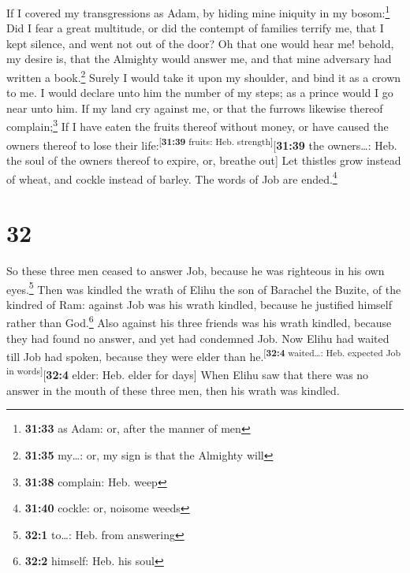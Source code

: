  If I covered my transgressions as Adam, by hiding mine
iniquity in my bosom:\footnote{\textbf{31:33} as Adam: or, after the
  manner of men}  Did I fear a great multitude, or did
the contempt of families terrify me, that I kept silence, and went not
out of the door?  Oh that one would hear me! behold, my
desire is, that the Almighty would answer me, and that mine adversary
had written a book.\footnote{\textbf{31:35} my\ldots: or, my sign is
  that the Almighty will}  Surely I would take it upon my
shoulder, and bind it as a crown to me.  I would declare
unto him the number of my steps; as a prince would I go near unto him.
 If my land cry against me, or that the furrows likewise
thereof complain;\footnote{\textbf{31:38} complain: Heb. weep}
 If I have eaten the fruits thereof without money, or
have caused the owners thereof to lose their
life:\textsuperscript{{[}\textbf{31:39} fruits: Heb.
strength{]}}{[}\textbf{31:39} the owners\ldots: Heb. the soul of the
owners thereof to expire, or, breathe out{]}  Let
thistles grow instead of wheat, and cockle instead of barley. The words
of Job are ended.\footnote{\textbf{31:40} cockle: or, noisome weeds}

\hypertarget{section-31}{%
\section{32}\label{section-31}}

 So these three men ceased to answer Job, because he was
righteous in his own eyes.\footnote{\textbf{32:1} to\ldots: Heb. from
  answering}  Then was kindled the wrath of Elihu the son
of Barachel the Buzite, of the kindred of Ram: against Job was his wrath
kindled, because he justified himself rather than God.\footnote{\textbf{32:2}
  himself: Heb. his soul}  Also against his three friends
was his wrath kindled, because they had found no answer, and yet had
condemned Job.  Now Elihu had waited till Job had spoken,
because they were elder than he.\textsuperscript{{[}\textbf{32:4}
waited\ldots: Heb. expected Job in words{]}}{[}\textbf{32:4} elder: Heb.
elder for days{]}  When Elihu saw that there was no answer
in the mouth of these three men, then his wrath was kindled.

